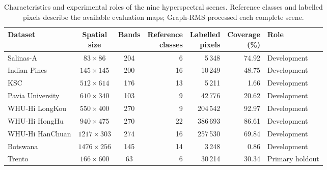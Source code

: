 \documentclass[10pt,a4paper,fleqn]{article}
\begin{document}
\begin{table}[htbp]
\centering
\small
\caption{Characteristics and experimental roles of the nine hyperspectral
scenes. Reference classes and labelled pixels describe the available evaluation
maps; Graph-RMS processed each complete scene.}
\label{tab:datasets}

\renewcommand{\arraystretch}{1.15}
\setlength{\tabcolsep}{4.2pt}

\begin{tabular}{@{}lccrrrl@{}}
\toprule
Dataset &
\makecell{Spatial\\size} &
Bands &
\makecell{Reference\\classes} &
\makecell{Labelled\\pixels} &
\makecell{Coverage\\(\%)} &
Role \\
\midrule

Salinas-A
& $83 \times 86$
& 204
& 6
& 5\,348
& 74.92
& Development \\

Indian Pines
& $145 \times 145$
& 200
& 16
& 10\,249
& 48.75
& Development \\

KSC
& $512 \times 614$
& 176
& 13
& 5\,211
& 1.66
& Development \\

Pavia University
& $610 \times 340$
& 103
& 9
& 42\,776
& 20.62
& Development \\

WHU-Hi LongKou
& $550 \times 400$
& 270
& 9
& 204\,542
& 92.97
& Development \\

WHU-Hi HongHu
& $940 \times 475$
& 270
& 22
& 386\,693
& 86.61
& Development \\

WHU-Hi HanChuan
& $1217 \times 303$
& 274
& 16
& 257\,530
& 69.84
& Development \\

Botswana
& $1476 \times 256$
& 145
& 14
& 3\,248
& 0.86
& Development \\

Trento
& $166 \times 600$
& 63
& 6
& 30\,214
& 30.34
& Primary holdout \\

\bottomrule
\end{tabular}
\end{table}


\FloatBarrier

\end{document}
